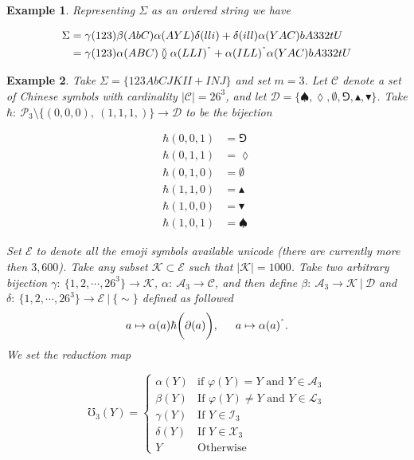 \documentclass[amsmath,12pt,a4paper]{amsart}
\newtheorem{example}{Example}
\begin{document}
\begin{example}
Representing $\Sigma$ as an ordered string we have 

\begin{equation}\label{Eq20}
\begin{split}
\Sigma  & = \gamma(123)\beta(AbC)\alpha(AYL)\delta(lli)+\delta(ill)\alpha(YAC)bA332tU\\
& = \gamma(123)\alpha(ABC)\between \alpha(LLI)^{\texttt{\^{}}}+ \alpha(ILL)^{\texttt{\^{}}}\alpha(YAC)bA332tU
\end{split}
\end{equation}

\end{example}
 
 \begin{example}\label{Ex2}
 Take $\Sigma = \{123AbCJKII+INJ\}$ and set $m=3$. Let $\mathcal{C}$ denote a set of Chinese symbols with cardinality $|\mathcal{C}| = 26^3$, and let $\mathcal{D} = \{\spadesuit,\lozenge, \emptyset,\Game,\blacktriangle,\blacktriangledown\}$. Take $\hbar:~\mathcal{P}_3\setminus \{(0,0,0), ~(1,1,1,)\}\rightarrow \mathcal{D}$ to be the bijection 
 
 
 \begin{equation}\label{Eq21}
 \begin{split}
 \hbar(0,0,1) & = \Game\\
  \hbar(0,1,1) & = \lozenge\\
 \hbar(0,1,0) & = \emptyset\\
 \hbar(1,1,0) & = \blacktriangle\\
 \hbar(1,0,0) & = \blacktriangledown\\
 \hbar(1,0,1) & = \spadesuit
 \end{split}
 \end{equation}
 
 
 Set $\mathcal{E}$ to denote all the emoji symbols available unicode (there are currently more then $3,600$). Take any subset $\mathcal{K}\subset \mathcal{E}$ such that $|\mathcal{K}|=1000$. Take two arbitrary bijection $\gamma:~\{1,2,\cdots,26^3\}\rightarrow \mathcal{K}$, $\alpha:~ \mathcal{A}_3\rightarrow \mathcal{C}$, and then define $\beta:~\mathcal{A}_3\rightarrow \mathcal{K}~\vert ~\mathcal{D}$ and $\delta:~\{1,2,\cdots, 26^3\}\rightarrow \mathcal{E} ~\vert ~\{\sim\}$ defined as followed  $$a\mapsto \alpha(a)\hbar\biggl(\partial (a)\biggr), \indent a\mapsto \alpha(a)^{\texttt{\^{}}}.$$ We set the reduction map 
 
\begin{equation}\label{Eq22}
\mho_3(Y) = \begin{cases}
\alpha(Y) & \text{if $\varphi(Y) = Y$ and $Y\in \mathcal{A}_3$}\\
\beta(Y) & \text{If $\varphi(Y)\neq Y$ and $Y\in \mathcal{L}_3$}\\
\gamma(Y) & \text{If $Y\in \mathcal{I}_3$}\\
\delta(Y) & \text{If $Y\in \mathcal{X}_3$}\\
Y & \text{Otherwise}
\end{cases}
\end{equation} 
 

\end{example}
\end{document}
